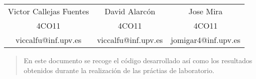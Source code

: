 \vfill
{
    \maketitle
    \vspace{1cm}
    \begin{center}
    \begin{tabular}{c c c}
        Victor Callejas Fuentes &  David Alarcón & Jose Mira\\
        \small 4CO11 & 4CO11 & 4CO11 \\
        \small viccalfu@inf.upv.es & viccalfu@inf.upv.es & jomigar4@inf.upv.es \\
    \end{tabular}
    \end{center}
    \vspace{1cm}
    \begin{abstract}
        \center En este documento se recoge el código desarrollado así como los resultados obtenidos durante la realización de las práctias de laboratorio.
    \end{abstract}

    \newpage
}